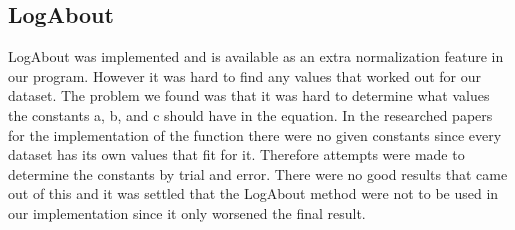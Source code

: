 \subsection{LogAbout}
LogAbout was implemented and is available as an extra normalization feature in our program. However it was hard to find any values that worked out for our dataset. The problem we found was that it was hard to determine what values the constants a, b, and c should have in the equation. In the researched papers for the implementation of the function there were no given constants since every dataset has its own values that fit for it.  Therefore attempts were made to determine the constants by trial and error. There were no good results that came out of this and it was settled that the LogAbout method were not to be used in our implementation since it only worsened the final result.
